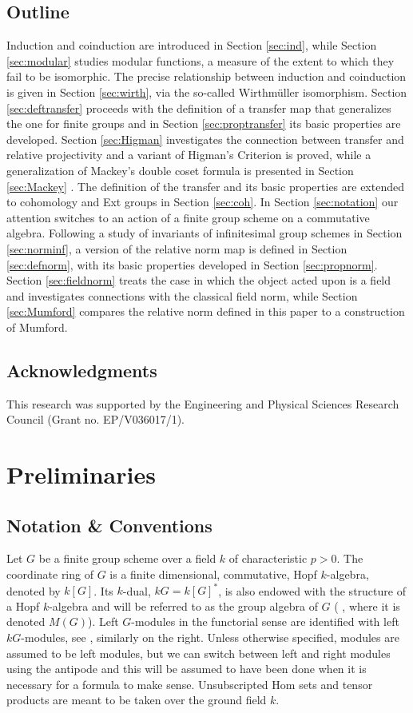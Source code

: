 \documentclass[12pt]{amsart}
\theoremstyle{definition}
\begin{document}
\subsection{Outline} Induction and coinduction are introduced in Section \ref{sec:ind}, while Section \ref{sec:modular} studies modular functions, a measure of the extent to which they fail to be isomorphic. The precise relationship between induction and coinduction is given in Section \ref{sec:wirth}, via the so-called Wirthm\"uller isomorphism. Section \ref{sec:deftransfer} proceeds with the definition of a transfer map that generalizes the one for finite groups and in Section \ref{sec:proptransfer} its basic properties are developed. Section \ref{sec:Higman} investigates the connection between transfer and relative projectivity and a variant of Higman's Criterion is proved, while a generalization of Mackey's double coset formula is presented in Section \ref{sec:Mackey} . The definition of the transfer and its basic properties are extended to cohomology and Ext groups in Section \ref{sec:coh}. In Section \ref{sec:notation} our attention switches to an action of a finite group scheme on a commutative algebra. Following a study of invariants of infinitesimal group schemes in Section \ref{sec:norminf}, a version of the relative norm map is defined in Section \ref{sec:defnorm}, with its basic properties developed in Section \ref{sec:propnorm}. Section \ref{sec:fieldnorm} treats the case in which the object acted upon is a field and investigates connections with the classical field norm, while Section \ref{sec:Mumford} compares the relative norm defined in this paper to a construction of Mumford.


\subsection*{Acknowledgments}
This research was supported by the Engineering and Physical Sciences Research Council (Grant no. EP/V036017/1).

\section{Preliminaries }\label{sec:prel}

\subsection{Notation \& Conventions}\label{sec:not}
Let $G$ be a finite group scheme over a field $k$ of characteristic $p>0$. The coordinate ring of $G$ is a finite dimensional, commutative, Hopf $k$-algebra, denoted by $k[G]$. Its $k$-dual, $kG=k[G]^*$, is also endowed with the structure of a Hopf $k$-algebra and will be referred to as the group algebra of $G$ (\cite[9.1.3]{MR1243637} , where it is denoted $M(G)$). Left $G$-modules in the functorial sense are identified with left $kG$-modules, see \cite[Theorem 2.1]{MR1885648}, similarly on the right. Unless otherwise specified, modules are assumed to be left modules, but we can switch between left and right modules using the antipode and this will be assumed to have been done when it is necessary for a formula to make sense. Unsubscripted Hom sets and tensor products are meant to be taken over the ground field $k$.
\end{document}
